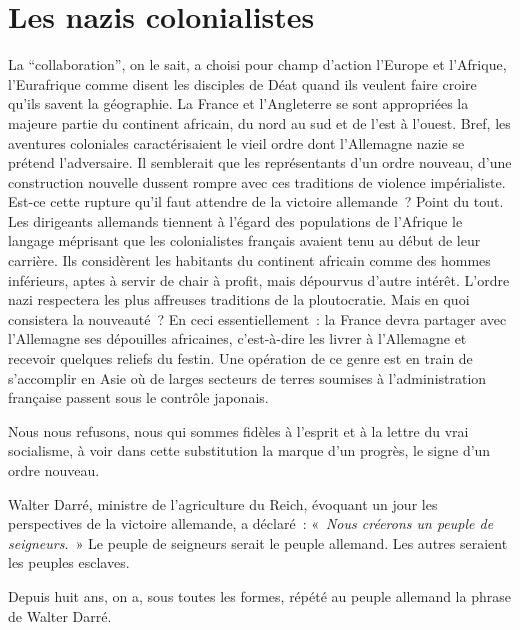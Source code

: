 \documentclass[french,twoside]{book} %
\begin{document}
\section[{Les nazis colonialistes}]{Les nazis colonialistes}
\noindent La “collaboration”, on le sait, a choisi pour champ d’action l’Europe et l’Afrique, l’Eurafrique comme disent les disciples de Déat quand ils veulent faire croire qu’ils savent la géographie. La France et l’Angleterre se sont appropriées la majeure partie du continent africain, du nord au sud et de l’est à l’ouest. Bref, les aventures coloniales caractérisaient le vieil ordre dont l’Allemagne nazie se prétend l’adversaire. Il semblerait que les représentants d’un ordre nouveau, d’une construction nouvelle dussent rompre avec ces traditions de violence impérialiste. Est-ce cette rupture qu’il faut attendre de la victoire allemande ? Point du tout. Les dirigeants allemands tiennent à l’égard des populations de l’Afrique le langage méprisant que les colonialistes français avaient tenu au début de leur carrière. Ils considèrent les habitants du continent africain comme des hommes inférieurs, aptes à servir de chair à profit, mais dépourvus d’autre intérêt. L’ordre nazi respectera les plus affreuses traditions de la ploutocratie. Mais en quoi consistera la nouveauté ? En ceci essentiellement : la France devra partager avec l’Allemagne ses dépouilles africaines, c’est-à-dire les livrer à l’Allemagne et recevoir quelques reliefs du festin. Une opération de ce genre est en train de s’accomplir en Asie où de larges secteurs de terres soumises à l’administration française passent sous le contrôle japonais.\par
Nous nous refusons, nous qui sommes fidèles à l’esprit et à la lettre du vrai socialisme, à voir dans cette substitution la marque d’un progrès, le signe d’un ordre nouveau.\par
Walter Darré, ministre de l’agriculture du Reich, évoquant un jour les perspectives de la victoire allemande, a déclaré : « \emph{Nous créerons un peuple de seigneurs.} » Le peuple de seigneurs serait le peuple allemand. Les autres seraient les peuples esclaves.\par
Depuis huit ans, on a, sous toutes les formes, répété au peuple allemand la phrase de Walter Darré.
\end{document}
